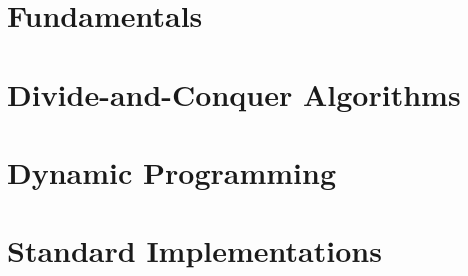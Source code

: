 \documentclass{article}
\newcommand{\LoadSection}[1]{{}}
\begin{document}
\thispagestyle{plain}
\MakeCustomTitle
\bigskip


{
    \hypersetup{linkcolor=black}
    \tableofcontents
}

\newpage

\section{Fundamentals}
\label{sec:fundamentals}

    \LoadSection{fundamentals/performance-and-big-o}
    \LoadSection{fundamentals/dynamic-arrays}
    \LoadSection{fundamentals/array-search-algorithms}
    \LoadSection{fundamentals/sorting-algorithms}
    \LoadSection{fundamentals/linked-lists}
    \LoadSection{fundamentals/bsts}
    \newpage
    \LoadSection{fundamentals/binary-heaps/intro}
    \newpage
    \LoadSection{fundamentals/binary-heaps/array-indexing}
    \newpage
    \LoadSection{fundamentals/binary-heaps/push}
    \newpage
    \LoadSection{fundamentals/binary-heaps/pop}
    \newpage
    \LoadSection{fundamentals/binary-heaps/pushpop}
    \newpage
    \LoadSection{fundamentals/binary-heaps/heapify}
    \newpage
    \LoadSection{fundamentals/binary-heaps/further-reading}
    \LoadSection{fundamentals/binary-heaps/references}
    \newpage
    \LoadSection{fundamentals/tries}
    \LoadSection{fundamentals/hash-tables}
    \LoadSection{fundamentals/graphs}

\newpage
\section{Divide-and-Conquer Algorithms}
\label{sec:doc}

    \LoadSection{divide-and-conquer/karatsuba-multiplication}
    \LoadSection{divide-and-conquer/fft}

\newpage
\section{Dynamic Programming}
\label{sec:dp}

    \LoadSection{dynamic-programming/intro}
    \LoadSection{dynamic-programming/fibonacci-sequence}
    \LoadSection{dynamic-programming/01-knapsack-problem}

\newpage
\section{Standard Implementations}
\label{sec:standard-implementations}
\end{document}
